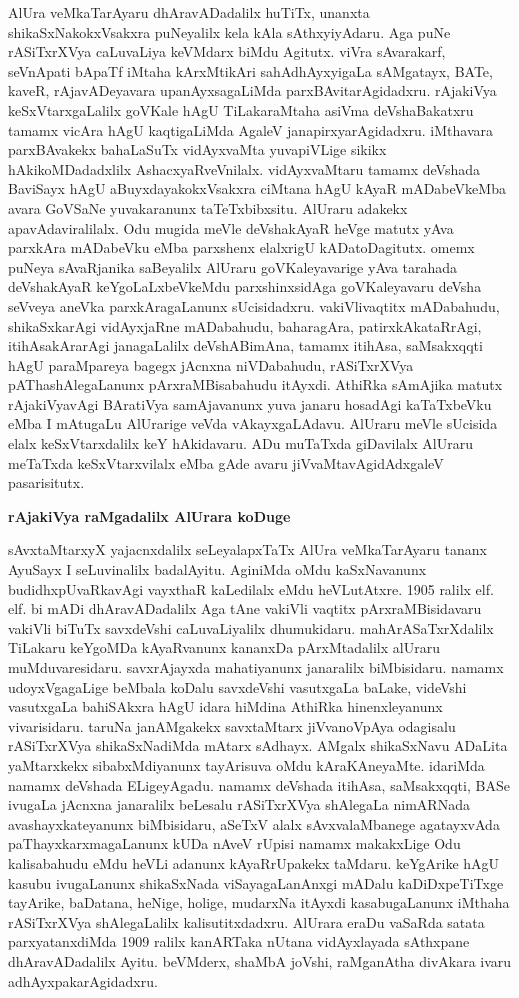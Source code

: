 \documentclass[11pt,a4size]{article}
\begin{document}
AlUra veMkaTarAyaru dhAravADadalilx huTiTx, unanxta
shikaSxNakokxVsakxra puNeyalilx kela kAla sAthxyiyAdaru. Aga puNe
rASiTxrXVya caLuvaLiya keVMdarx biMdu Agitutx. viVra sAvarakarf,
seVnApati bApaTf iMtaha kArxMtikAri sahAdhAyxyigaLa sAMgatayx, BATe,
kaveR, rAjavADeyavara upanAyxsagaLiMda parxBAvitarAgidadxru. rAjakiVya
keSxVtarxgaLalilx goVKale hAgU TiLakaraMtaha asiVma deVshaBakatxru
tamamx vicAra hAgU kaqtigaLiMda AgaleV janapirxyarAgidadxru. iMthavara
parxBAvakekx bahaLaSuTx vidAyxvaMta yuvapiVLige sikikx
hAkikoMDadadxlilx AshacxyaRveVnilalx. vidAyxvaMtaru tamamx deVshada
BaviSayx hAgU aBuyxdayakokxVsakxra ciMtana hAgU kAyaR mADabeVkeMba
avara GoVSaNe yuvakaranunx taTeTxbibxsitu. AlUraru adakekx
apavAdaviralilalx. Odu mugida meVle deVshakAyaR heVge matutx yAva
parxkAra mADabeVku eMba parxshenx elalxrigU kADatoDagitutx. omemx
puNeya sAvaRjanika saBeyalilx AlUraru goVKaleyavarige yAva tarahada
deVshakAyaR keYgoLaLxbeVkeMdu parxshinxsidAga goVKaleyavaru deVsha
seVveya aneVka parxkAragaLanunx sUcisidadxru. vakiVlivaqtitx
mADabahudu, shikaSxkarAgi vidAyxjaRne mADabahudu, baharagAra,
patirxkAkataRrAgi, itihAsakArarAgi janagaLalilx deVshABimAna, tamamx
itihAsa, saMsakxqqti hAgU paraMpareya bagegx jAcnxna niVDabahudu,
rASiTxrXVya pAThashAlegaLanunx pArxraMBisabahudu itAyxdi. AthiRka
sAmAjika matutx rAjakiVya\-vAgi BAratiVya samAjavanunx yuva janaru
hosadAgi kaTaTxbeVku eMba I mAtugaLu AlUrarige veVda
vAkayxgaLAdavu. AlUraru meVle sUcisida elalx keSxVtarxdalilx keY
hAkidavaru. ADu muTaTxda giDavilalx AlUraru meTaTxda keSxVtarxvilalx
eMba gAde avaru jiVvaMtavAgidAdxgaleV pasarisitutx.

\bigskip
\centerline{\textbf{\Large{rAjakiVya raMgadalilx AlUrara koDuge}}}
\medskip

sAvxtaMtarxyX yajacnxdalilx seLeyalapxTaTx AlUra veMkaTarAyaru tananx
AyuSayx I seLuvinalilx badalAyitu. Agi\-niMda oMdu kaSxNavanunx
budidhxpUvaRkavAgi vayxthaR kaLedilalx eMdu heVLutAtxre. 1905 ralilx
elf. elf. bi mADi dhAravADadalilx Aga tAne vakiVli vaqtitx
pArxraMBisidavaru vakiVli biTuTx savxdeVshi caLuvaLiyalilx
dhumukidaru. mahArASaTxrXdalilx TiLakaru keYgoMDa kAyaRvanunx kananxDa
pArxMtadalilx alUraru muMduvaresidaru. savxrAjayxda mahatiyanunx
janaralilx biMbisidaru. namamx udoyxVgagaLige beMbala koDalu
savxdeVshi vasutxgaLa baLake, videVshi vasutxgaLa bahiSAkxra hAgU
idara hiMdina AthiRka hinenxleyanunx vivarisidaru. taruNa janAMgakekx
savxtaMtarx jiVvanoVpAya odagisalu rASiTxrXVya shikaSxNadiMda mAtarx
sAdhayx. AMgalx shikaSxNavu ADaLita yaMtarxkekx sibabxMdiyanunx
tayArisuva oMdu kAraKAneyaMte. idariMda namamx deVshada
ELigeyAgadu. namamx deVshada itihAsa, saMsakxqqti, BASe ivugaLa
jAcnxna janaralilx beLesalu rASiTxrXVya shAlegaLa nimARNada
avashayxkateyanunx biMbisidaru, aSeTxV alalx sAvxvalaMbanege
agatayxvAda paThayxkarxmagaLanunx kUDa nAveV rUpisi namamx makakxLige
Odu kalisabahudu eMdu heVLi adanunx kAyaRrUpakekx taMdaru. keYgArike
hAgU kasubu ivugaLanunx shikaSxNada viSayagaLanAnxgi mADalu
kaDiDxpeTiTxge tayArike, baDatana, heNige, holige, mudarxNa itAyxdi
kasabugaLanunx iMthaha rASiTxrXVya shAlegaLalilx
kalisutitxdadxru. AlUrara eraDu vaSaRda satata parxyatanxdiMda 1909
ralilx kanARTaka nUtana vidAyxlayada sAthxpane dhAravADadalilx
Ayitu. beVMderx, shaMbA joVshi, raMganAtha divAkara ivaru
adhAyxpakarAgidadxru.
\end{document}
